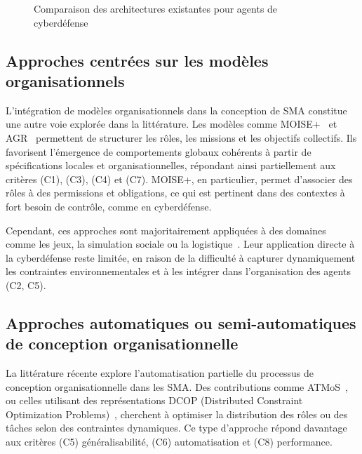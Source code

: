 \documentclass[ twoside,openright,titlepage,numbers=noenddot,headinclude,%
                footinclude=true,cleardoublepage=empty,abstractoff, %
                BCOR=5mm,paper=a4,fontsize=11pt,%
                french,american,%
                ]{scrreprt}
\begin{document}
\begin{figure}[h]
    \centering
    \caption{Comparaison des architectures existantes pour agents de cyberdéfense}
    \label{fig:architectures-aica}
\end{figure}

\subsection*{Approches centrées sur les modèles organisationnels}

L'intégration de modèles organisationnels dans la conception de SMA constitue une autre voie explorée dans la littérature. Les modèles comme MOISE+~\cite{hubner2002moise} et AGR~\cite{ferber2003agr} permettent de structurer les rôles, les missions et les objectifs collectifs. Ils favorisent l'émergence de comportements globaux cohérents à partir de spécifications locales et organisationnelles, répondant ainsi partiellement aux critères (C1), (C3), (C4) et (C7). MOISE+, en particulier, permet d'associer des rôles à des permissions et obligations, ce qui est pertinent dans des contextes à fort besoin de contrôle, comme en cyberdéfense.

Cependant, ces approches sont majoritairement appliquées à des domaines comme les jeux, la simulation sociale ou la logistique~\cite{ricordel2000analysis}. Leur application directe à la cyberdéfense reste limitée, en raison de la difficulté à capturer dynamiquement les contraintes environnementales et à les intégrer dans l'organisation des agents (C2, C5).

\subsection*{Approches automatiques ou semi-automatiques de conception organisationnelle}

La littérature récente explore l'automatisation partielle du processus de conception organisationnelle dans les SMA. Des contributions comme ATMoS~\cite{atmos2019}, ou celles utilisant des représentations DCOP (Distributed Constraint Optimization Problems)~\cite{modi2005adopt}, cherchent à optimiser la distribution des rôles ou des tâches selon des contraintes dynamiques. Ce type d'approche répond davantage aux critères (C5) généralisabilité, (C6) automatisation et (C8) performance.
\end{document}
